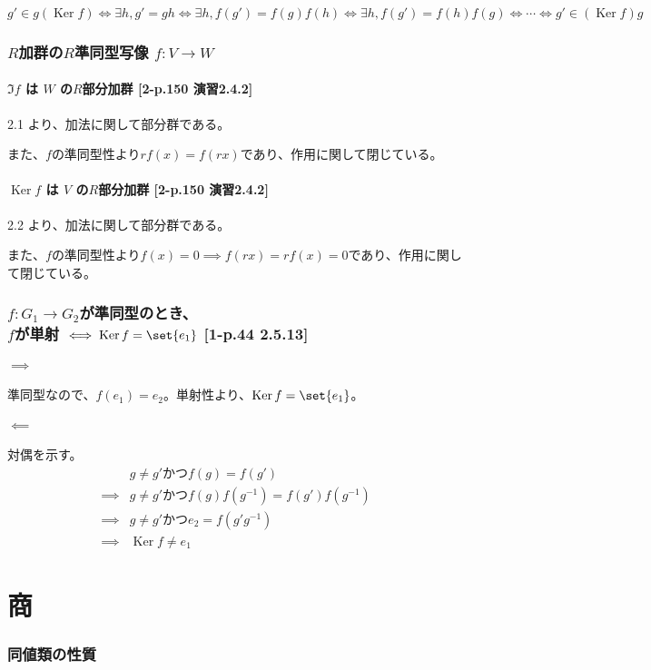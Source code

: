 \documentclass[twocolumn]{jsarticle}
\newcommand{\inv}[1]{#1^{-1}}
\DeclareMathOperator{\Ker}{Ker}
\begin{document}
\(g'\in g(\Ker f) \iff \exists h, g' = gh \iff  \exists h, f(g') = f(g)f(h) \iff  \exists h, f(g') = f(h)f(g) \iff \cdots \iff g'\in (\Ker f)g\)
\section{\(R\)加群の\(R\)準同型写像 \(f\colon V \to W\)}
\subsection{\(\Im f\) は \(W\) の\(R\)部分加群 [2-p.150 演習2.4.2]}
2.1 より、加法に関して部分群である。

また、\(f\)の準同型性より\(rf(x)=f(rx)\)であり、作用に関して閉じている。
\subsection{\(\Ker f\) は \(V\) の\(R\)部分加群 [2-p.150 演習2.4.2]}
2.2 より、加法に関して部分群である。

また、\(f\)の準同型性より\(f(x)=0\implies f(rx)=rf(x)=0\)であり、作用に関して閉じている。

\section{\(f\colon G_1\to G_2\)が準同型のとき、\\ \(f\)が単射 \(\iff \Ker f = \set{e_1}\) [1-p.44 2.5.13]}
\subsection{\(\implies\)}
準同型なので、\(f(e_1)=e_2\)。単射性より、\(\Ker f = \set{e_1}\)。
\subsection{\(\impliedby\)}
対偶を示す。
\begin{align*}
& g\neq g' かつ f(g)=f(g') \\
\implies& g\neq g' かつ f(g)f(\inv{g})=f(g')f(\inv{g}) \\
\implies& g\neq g' かつ e_2=f(g'\inv{g}) \\
\implies& \Ker f \neq {e_1}
\end{align*}
\newpage

\part*{商}
\setcounter{section}{0}
\section{同値類の性質}
\end{document}
